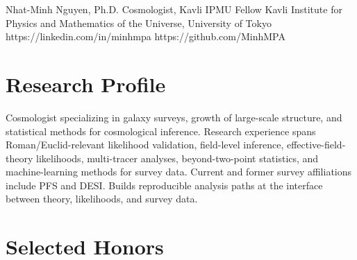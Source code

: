 



\cvheader
  {Nhat-Minh Nguyen, Ph.D.}
  {Cosmologist, Kavli IPMU Fellow}
  {Kavli Institute for Physics and Mathematics of the Universe, University of Tokyo}
  {https://linkedin.com/in/minhmpa}
  {https://github.com/MinhMPA}

\section*{Research Profile}
Cosmologist specializing in galaxy surveys, growth of large-scale structure, and statistical methods for cosmological inference. Research experience spans Roman/Euclid-relevant likelihood validation, field-level inference, effective-field-theory likelihoods, multi-tracer analyses, beyond-two-point statistics, and machine-learning methods for survey data. Current and former survey affiliations include PFS and DESI. Builds reproducible analysis paths at the interface between theory, likelihoods, and survey data.

\section*{Selected Honors}

